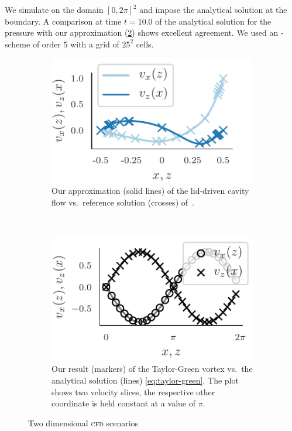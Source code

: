 \documentclass[runningheads]{llncs}
\begin{document}
We simulate on the domain $[0,2\pi]^2$ 
and impose the analytical solution at the boundary.
A comparison at time $t = 10.0$ of the analytical solution for the pressure with our approximation (\cref{fig:taylor-green}) shows excellent agreement.
We used an \aderdg{}-scheme of order $5$ with a grid of $25^2$ cells.

\begin{figure}[tb]
  \centering
  \begin{subfigure}[t]{0.5\textwidth}
    \centering
    \includegraphics{paper_lid_driven_cavity}
    \caption{\label{fig:cavity-flow}Our approximation (solid lines) of the lid-driven cavity flow vs.\ reference solution (crosses) of~\cite{ghia1982high}.}
  \end{subfigure}~%
  \begin{subfigure}[t]{0.5\textwidth}
    \centering
    \includegraphics{paper_taylor_green_vel}
    \caption{\label{fig:taylor-green}Our result (markers) of the Taylor-Green vortex vs.\ the analytical solution (lines) \cref{eq:taylor-green}.
    The plot shows two velocity slices, the respective other coordinate is held constant at a value of $\pi$.}

  \end{subfigure}
  \caption{Two dimensional \textsc{cfd} scenarios}
  \label{fig:cdf-results}
\end{figure}
\end{document}
